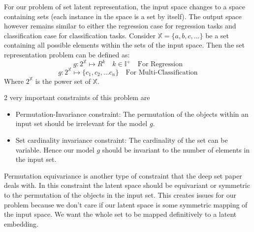\documentclass[12pt, twoside, ngerman]{report}
\begin{document}
For our problem of set latent representation,  the input space changes to a space containing sets (each instance in the space is a set by itself).
The output space however remains similar to either the regression case for regression tasks and classification case for classification tasks.
Consider $\mathbb{X} = \{a,b,  c, ... \}$ be a set containing all possible elements within the sets of the input space.
Then the set representation problem can be defined as:
$$
g : 2^{\mathbb{X}} \mapsto R^k   \quad k \in \mathbb{I}^+ \quad \textrm{For Regression}
$$
$$
g : 2^{\mathbb{X}} \mapsto \{c_1, c_2, ... c_n\}  \quad \textrm{For Multi-Classification}
$$
Where $2^{\mathbb{X}}$ is the power set of $\mathbb{X}$.

2 very important constraints of this problem are
\begin{itemize}
\item Permutation-Invariance constraint: The permutation of the objects within an input set should be irrelevant for the model $g$.
\item Set cardinality invariance constraint: The cardinality of the set can be variable.
Hence our model $g$ should be invariant to the number of elements in the input set.
\end{itemize}

Permutation equivariance is another type of constraint that the deep set paper deals with.
In this constraint the latent space should be equivariant or symmetric to the permutation of the objects in the input set.
This creates issues for our problem because we don't care if our latent space is some symmetric mapping of the input space.
We want the whole set to be mapped definitively to a latent embedding.
\end{document}
